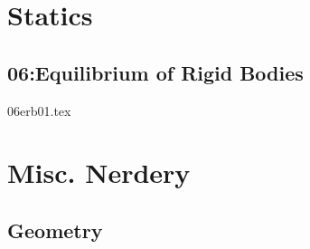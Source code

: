 \documentclass[9pt,svgnames,x11names]{beamer}
\def\scale{1} %
\begin{document}
\section{Statics}
\subsection{06:Equilibrium of Rigid Bodies}
\def\scale{0.875}
\centering
\begin{frame}{06erb01.tex}
    
\end{frame}

\section{Misc. Nerdery}
\subsection{Geometry}
\end{document}
